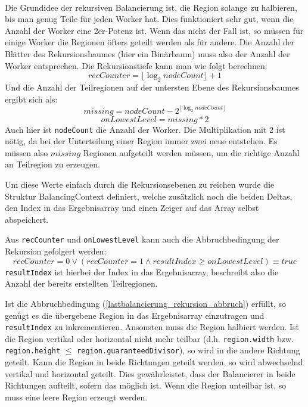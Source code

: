\paragraph*{}\label{lastbalancierung_naiv_rekursion}
Die Grundidee der rekursiven Balancierung ist, die Region solange zu halbieren, bis man genug Teile für jeden Worker hat.
Dies funktioniert sehr gut, wenn die Anzahl der Worker eine 2er-Potenz ist. Wenn das nicht der Fall ist, so müssen für einige Worker die Regionen öfters geteilt werden als für andere.
Die Anzahl der Blätter des Rekursionsbaumes (hier ein Binärbaum) muss also der Anzahl der Worker entsprechen.
Die Rekursionstiefe kann man wie folgt berechnen:
\begin{equation}\label{lastbalancierung_rekursion_tiefe}
	recCounter = \lfloor\log_2 nodeCount\rfloor + 1
\end{equation}
Und die Anzahl der Teilregionen auf der untersten Ebene des Rekursionsbaumes ergibt sich als:
\begin{equation*}
	missing = nodeCount - 2^{\lfloor\log_2 nodeCount\rfloor}
\end{equation*}
\begin{equation}\label{lastbalancierung_rekursion_ebene}
	onLowestLevel = missing * 2
\end{equation}
Auch hier ist \verb|nodeCount| die Anzahl der Worker. Die Multiplikation mit 2 ist nötig, da bei der Unterteilung einer Region immer zwei neue entstehen. Es müssen also $missing$ Regionen aufgeteilt werden müssen, um die richtige Anzahl an Teilregion zu erzeugen.

Um diese Werte einfach durch die Rekursionsebenen zu reichen wurde die Struktur BalancingContext definiert, welche zusätzlich noch die beiden Deltas, den Index in das Ergebnisarray und einen Zeiger auf das Array selbst abspeichert.

Aus \verb|recCounter| und \verb|onLowestLevel| kann auch die Abbruchbedingung der Rekursion gefolgert werden:
\begin{equation}\label{lastbalancierung_rekursion_abbruch}
	recCounter = 0 \vee (recCounter = 1 \wedge resultIndex \geq onLowestLevel) \equiv true
\end{equation}
\verb|resultIndex| ist hierbei der Index in das Ergebnisarray, beschreibt also die Anzahl der bereits erstellten Teilregionen.

Ist die Abbruchbedingung (\ref{lastbalancierung_rekursion_abbruch}) erfüllt, so genügt es die übergebene Region in das Ergebnisarray einzutragen und \verb|resultIndex| zu inkrementieren.
Ansonsten muss die Region halbiert werden. Ist die Region vertikal oder horizontal nicht mehr teilbar (d.h. \verb|region.width| bzw. \verb|region.height| $\leq$ \verb|region.guaranteedDivisor|), so wird in die andere Richtung geteilt.
Kann die Region in beide Richtungen geteilt werden, so wird abwechselnd vertikal und horizontal geteilt. Dies gewährleistet, dass der Balancierer in beide Richtungen aufteilt, sofern das möglich ist.
Wenn die Region unteilbar ist, so muss eine leere Region erzeugt werden.

